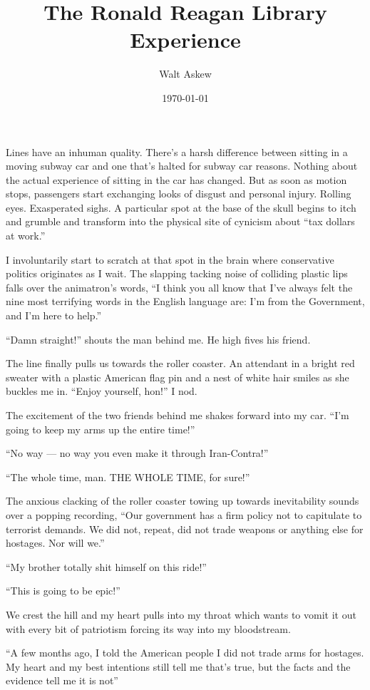 \documentclass[12pt, oneside]{memoir}
\title{The Ronald Reagan Library Experience}
\author{Walt Askew}
\date{\today}
\begin{document}
\maketitle

Lines have an inhuman quality.
There's a harsh difference between sitting in a moving subway car
and one that's halted for subway car reasons.
Nothing about the actual experience of sitting in the car has changed.
But as soon as motion stops, passengers start exchanging looks of
disgust and personal injury.
Rolling eyes.
Exasperated sighs.
A particular spot at the base of the skull begins to itch and grumble
and transform into the physical site of cynicism about ``tax dollars at
work.''

I involuntarily start to scratch at that spot in the brain where
conservative politics originates as I wait.
The slapping tacking noise of colliding plastic lips falls over the
animatron's words, 
``I think you all know that I've always felt the nine most terrifying
words in the English language are: I'm from the Government, and I'm
here to help.''

``Damn straight!'' shouts the man behind me.
He high fives his friend.

The line finally pulls us towards the roller coaster.
An attendant in a bright red sweater with a plastic American flag pin
and a nest of white hair smiles as she buckles me in.
``Enjoy yourself, hon!''
I nod.

The excitement of the two friends behind me shakes forward into my car.
``I'm going to keep my arms up the entire time!''  

``No way --- no way you even make it through Iran-Contra!''

``The whole time, man. THE WHOLE TIME, for sure!''

The anxious clacking of the roller coaster towing up towards
inevitability sounds over a popping recording,
``Our government has a firm policy not to capitulate to terrorist
demands. We did not, repeat, did not trade weapons or anything else
for hostages. Nor will we.''

``My brother totally shit himself on this ride!''

``This is going to be epic!''

We crest the hill and my heart pulls into my throat which wants to
vomit it out with every bit of patriotism forcing its way into my
bloodstream.

``A few months ago, I told the American people I did not trade arms
for hostages. My heart and my best intentions still tell me that's
true, but the facts and the evidence tell me it is not''
\end{document}
